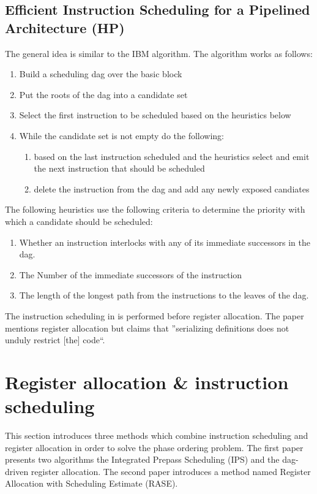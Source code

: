 \documentclass[a4paper,10pt]{article}
\begin{document}
\subsection{Efficient Instruction Scheduling for a Pipelined Architecture (HP)}
The general idea is similar to the IBM algorithm. The algorithm works as follows:
\begin{enumerate}
 \item Build a scheduling dag over the basic block
 \item Put the roots of the dag into a candidate set
 \item Select the first instruction to be scheduled based on the heuristics below
 \item While the candidate set is not empty do the following:
    \begin{enumerate}
    \item based on the last instruction scheduled and the heuristics select and emit the next instruction that should be scheduled
    \item delete the instruction from the dag and add any newly exposed candiates
    \end{enumerate}
\end{enumerate}

The following heuristics use the following criteria to determine the priority with which a candidate should be scheduled:
\begin{enumerate}
 \item Whether an instruction interlocks with any of its immediate successors in the dag.
 \item The Number of the immediate successors of the instruction
 \item The length of the longest path from the instructions to the leaves of the dag.
\end{enumerate}

The instruction scheduling in is performed before register allocation. The paper mentions register allocation but claims that
''serializing definitions does not unduly restrict [the] code``.

\section{Register allocation \& instruction scheduling}
This section introduces three methods which combine instruction scheduling and register allocation in order to solve the phase
ordering problem. The first paper presents two algorithms the Integrated Prepass Scheduling (IPS) and the dag-driven register allocation.
The second paper introduces a method named Register Allocation with Scheduling Estimate (RASE).
\end{document}
